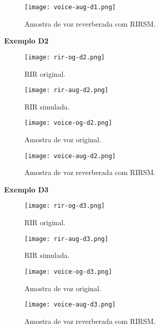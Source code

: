 \begin{figure} [H]
    \centering
    \texttt{[image: voice-aug-d1.png]}
    \caption{Amostra de voz reverberada com RIRSM.}
    \label{fig-a:voice-aug-d1}
\end{figure}

\pagebreak
{\Large \textbf{Exemplo D2}}

\begin{figure} [H]
    \centering
    \texttt{[image: rir-og-d2.png]}
    \caption{RIR original.}
    \label{fig-a:rir-og-d2}
\end{figure} 

\begin{figure} [H]
    \centering
    \texttt{[image: rir-aug-d2.png]}
    \caption{RIR simulada.}
    \label{fig-a:rir-aug-d2}
\end{figure} 

\begin{figure} [H]
    \centering
    \texttt{[image: voice-og-d2.png]}
    \caption{Amostra de voz original.}
    \label{fig-a:voice-og-d2}
\end{figure} 

\begin{figure} [H]
    \centering
    \texttt{[image: voice-aug-d2.png]}
    \caption{Amostra de voz reverberada com RIRSM.}
    \label{fig-a:voice-aug-d2}
\end{figure}

\pagebreak
{\Large \textbf{Exemplo D3}}

\begin{figure} [H]
    \centering
    \texttt{[image: rir-og-d3.png]}
    \caption{RIR original.}
    \label{fig-a:rir-og-d3}
\end{figure} 

\begin{figure} [H]
    \centering
    \texttt{[image: rir-aug-d3.png]}
    \caption{RIR simulada.}
    \label{fig-a:rir-aug-d3}
\end{figure} 

\begin{figure} [H]
    \centering
    \texttt{[image: voice-og-d3.png]}
    \caption{Amostra de voz original.}
    \label{fig-a:voice-og-d3}
\end{figure} 

\begin{figure} [H]
    \centering
    \texttt{[image: voice-aug-d3.png]}
    \caption{Amostra de voz reverberada com RIRSM.}
    \label{fig-a:voice-aug-d3}
\end{figure}

